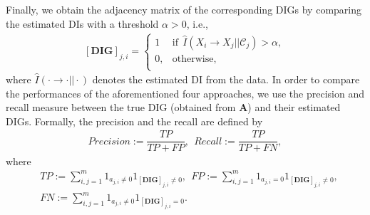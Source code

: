 Finally, we obtain the adjacency matrix of the corresponding DIGs by comparing the estimated DIs with a threshold $\alpha>0$, i.e., 
\begin{align}\label{eq:m}
    [\textbf{DIG}]_{j,i}=\left\{
\begin{array}{ll}
      1  & \text{if}\ \ \widehat{I}(X_i\rightarrow X_j||\mathcal{C}_j)>\alpha, \\
      0,  & \text{otherwise}, \\
\end{array} 
\right.
\end{align}
where $\widehat{I}(\cdot\rightarrow\cdot||\cdot)$ denotes the estimated DI from the data. 
In order to compare the performances of the aforementioned four approaches, we use the precision and recall measure between the true DIG (obtained from $\textbf{A}$) and their estimated DIGs. 
Formally, the precision and the recall are defined by
\begin{align*}
    Precision:= \dfrac{TP}{TP+FP}, \ \ Recall:= \dfrac{TP}{TP+FN},
\end{align*}
where 
\begin{align*}
    & TP := \sum_{i,j=1}^m 1_{a_{j,i} \neq 0}1_{ [\textbf{DIG}]_{j,i} \neq 0}, \ \ FP := \sum_{i,j=1}^m 1_{a_{j,i} = 0}1_{ [\textbf{DIG}]_{j,i} \neq 0},\\
    & FN := \sum_{i,j=1}^m 1_{a_{j,i} \neq 0}1_{ [\textbf{DIG}]_{j,i} = 0}.
\end{align*}

    
